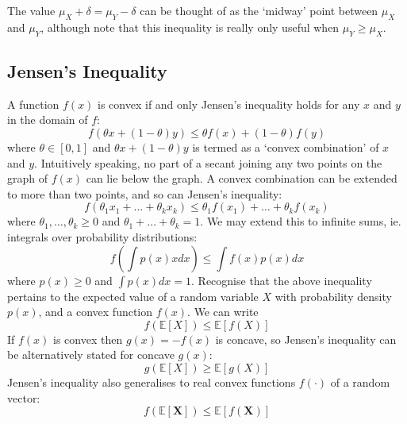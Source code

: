 \documentclass[11pt]{report} %
\begin{document}
The value $\mu_{X} + \delta = \mu_{Y} - \delta$ can be thought of as the `midway' point between $\mu_{X}$ and $\mu_{Y}$, although note that this inequality is really only useful when $\mu_{Y} \geq \mu_{X}$.

\subsection{Jensen's Inequality}

A function $f\left(x\right)$ is convex if and only Jensen's inequality holds for any $x$ and $y$ in the domain of $f$:
\begin{equation}
f\left(\theta x + \left(1 - \theta\right)y\right) \leq \theta f\left(x\right) + \left(1 - \theta\right)f\left(y\right)
\end{equation}
where $\theta \in \left[0, 1\right]$ and $\theta x + \left(1 - \theta\right)y$ is termed as a `convex combination' of $x$ and $y$. Intuitively speaking, no part of a secant joining any two points on the graph of $f\left(x\right)$ can lie below the graph. A convex combination can be extended to more than two points, and so can Jensen's inequality:
\begin{equation}
f\left(\theta_{1}x_{1} + \dots + \theta_{k}x_{k}\right) \leq \theta_{1}f\left(x_{1}\right) + \dots + \theta_{k}f\left(x_{k}\right)
\end{equation}
where $\theta_{1}, \dots, \theta_{k} \geq 0$ and $\theta_{1} + \dots + \theta_{k} = 1$. We may extend this to infinite sums, ie. integrals over probability distributions:
\begin{equation}
f\left(\int p\left(x\right) x dx\right) \leq \int f\left(x\right)p\left(x\right) dx
\end{equation}
where $p\left(x\right) \geq 0$ and $\int p\left(x\right) dx = 1$. Recognise that the above inequality pertains to the expected value of a random variable $X$ with probability density $p\left(x\right)$, and a convex function $f\left(x\right)$. We can write
\begin{equation}
f\left(\mathbb{E}\left[X\right]\right) \leq \mathbb{E}\left[f\left(X\right)\right]
\end{equation}
If $f\left(x\right)$ is convex then $g\left(x\right) = -f\left(x\right)$ is concave, so Jensen's inequality can be alternatively stated for concave $g\left(x\right)$:
\begin{equation}
g\left(\mathbb{E}\left[X\right]\right) \geq \mathbb{E}\left[g\left(X\right)\right]
\end{equation}
Jensen's inequality also generalises to real convex functions $f\left(\cdot\right)$ of a random vector:
\begin{equation}
f\left(\mathbb{E}\left[\mathbf{X}\right]\right) \leq \mathbb{E}\left[f\left(\mathbf{X}\right)\right]
\end{equation}
\end{document}
